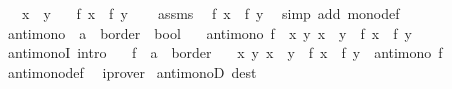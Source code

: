 \begin{isabellebody}
\ \ \ {\isachardoublequoteopen}x\ {\isasymle}\ y{\isachardoublequoteclose}\isanewline
\ \ \ {\isachardoublequoteopen}f\ x\ {\isasymle}\ f\ y{\isachardoublequoteclose}\isanewline
%
\isadelimproof
%
\endisadelimproof
%
\isatagproof
{}\isamarkupfalse%
\isanewline
\ \ \isamarkupfalse%
\ assms\ \isamarkupfalse%
\ {\isachardoublequoteopen}f\ x\ {\isasymle}\ f\ y{\isachardoublequoteclose}\ \isamarkupfalse%
\ {\isacharparenleft}{\kern0pt}simp\ add{\isacharcolon}{\kern0pt}\ mono{\isacharunderscore}{\kern0pt}def{\isacharparenright}{\kern0pt}\isanewline
{}\isamarkupfalse%
%
\endisatagproof
{\isafoldproof}%
%
\isadelimproof
\isanewline
%
\endisadelimproof
\isanewline
{}\isamarkupfalse%
\ antimono\ {\isacharcolon}{\kern0pt}{\isacharcolon}{\kern0pt}\ {\isachardoublequoteopen}{\isacharparenleft}{\kern0pt}{\isacharprime}{\kern0pt}a\ {\isasymRightarrow}\ {\isacharprime}{\kern0pt}b{\isacharcolon}{\kern0pt}{\isacharcolon}{\kern0pt}order{\isacharparenright}{\kern0pt}\ {\isasymRightarrow}\ bool{\isachardoublequoteclose}\ \isanewline
\ \ {\isachardoublequoteopen}antimono\ f\ {\isasymlongleftrightarrow}\ {\isacharparenleft}{\kern0pt}{\isasymforall}x\ y{\isachardot}{\kern0pt}\ x\ {\isasymle}\ y\ {\isasymlongrightarrow}\ f\ x\ {\isasymge}\ f\ y{\isacharparenright}{\kern0pt}{\isachardoublequoteclose}\isanewline
\isanewline
{}\isamarkupfalse%
\ antimonoI\ {\isacharbrackleft}{\kern0pt}intro{\isacharquery}{\kern0pt}{\isacharbrackright}{\kern0pt}{\isacharcolon}{\kern0pt}\isanewline
\ \ \ f\ {\isacharcolon}{\kern0pt}{\isacharcolon}{\kern0pt}\ {\isachardoublequoteopen}{\isacharprime}{\kern0pt}a\ {\isasymRightarrow}\ {\isacharprime}{\kern0pt}b{\isacharcolon}{\kern0pt}{\isacharcolon}{\kern0pt}order{\isachardoublequoteclose}\isanewline
\ \ \ {\isachardoublequoteopen}{\isacharparenleft}{\kern0pt}{\isasymAnd}x\ y{\isachardot}{\kern0pt}\ x\ {\isasymle}\ y\ {\isasymLongrightarrow}\ f\ x\ {\isasymge}\ f\ y{\isacharparenright}{\kern0pt}\ {\isasymLongrightarrow}\ antimono\ f{\isachardoublequoteclose}\isanewline
%
\isadelimproof
\ \ %
\endisadelimproof
%
\isatagproof
{}\isamarkupfalse%
\ antimono{\isacharunderscore}{\kern0pt}def\ \isamarkupfalse%
\ iprover%
\endisatagproof
{\isafoldproof}%
%
\isadelimproof
\isanewline
%
\endisadelimproof
\isanewline
{}\isamarkupfalse%
\ antimonoD\ {\isacharbrackleft}{\kern0pt}dest{\isacharquery}{\kern0pt}{\isacharbrackright}{\kern0pt}{\isacharcolon}{\kern0pt}\isanewline

\end{isabellebody}
